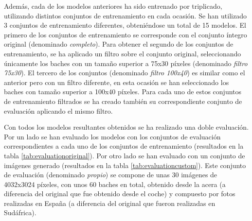 Además, cada de los modelos anteriores ha sido entrenado por triplicado, utilizando distintos conjuntos de entrenamiento en cada ocasión. Se han utilizado 3 conjuntos de entrenamiento diferentes, obteniéndose un total de 15 modelos. El primero de los conjuntos de entrenamiento se corresponde con el conjunto íntegro original (denominado \textit{completo}). Para obtener el segundo de los conjuntos de entrenamiento, se ha aplicado un filtro sobre el conjunto original, seleccionando únicamente los baches con un tamaño superior a 75x30 píxeles (denominado \textit{filtro 75x30}). El tercero de los conjuntos (denominado \textit{filtro 100x40}) es similar como el anterior pero con un filtro diferente, en esta ocasión se han seleccionado los baches con tamaño superior a 100x40 píxeles. Para cada uno de estos conjuntos de entrenamiento filtrados se ha creado también su correspondiente conjunto de evaluación aplicando el mismo filtro.

Con todos los modelos resultantes obtenidos se ha realizado una doble evaluación. Por un lado se han evaluado los modelos con los conjuntos de evaluación correspondientes a cada uno de los conjuntos de entrenamiento (resultados en la tabla \ref{tab:evaluationoriginal}). Por otro lado se han evaluado con un conjunto de imágenes generado (resultados en la tabla \ref{tab:evaluationcustom}). Este conjunto de evaluación (denominado \textit{propio}) se compone de unas 30 imágenes de 4032x3024 píxeles, con unos 60 baches en total, obtenido desde la acera (a diferencia del original que fue obtenido desde el coche) y compuesto por fotos realizadas en España (a diferencia del original que fueron realizadas en Sudáfrica).

